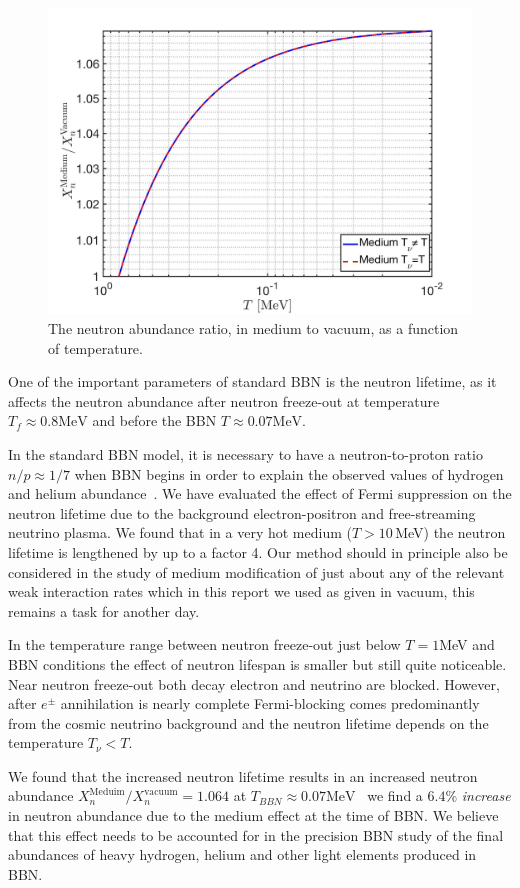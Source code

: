 \begin{figure} 
\centerline{\includegraphics[width=0.8\linewidth]{./plots/Neutron_Abundance}}
\caption{The neutron abundance ratio, in medium to vacuum, as a function of temperature. }
\label{Neutron:Abundance} 
\end{figure}

One of the important parameters of standard BBN is the neutron lifetime, as it affects the neutron abundance after neutron freeze-out at temperature $T_f\approx 0.8 \mathrm{MeV}$ and before the BBN $T\approx0.07 \mathrm{MeV}$. 

In the standard BBN model, it is necessary to have a neutron-to-proton ratio $n/p\approx1/7$ when BBN begins in order to explain the observed values of hydrogen and helium abundance~\cite{Pitrou:2018cgg}. We have evaluated the effect of Fermi suppression on the neutron lifetime due to the background electron-positron  and free-streaming neutrino plasma. We found that in a very hot medium ($T>10$\,MeV) the neutron lifetime is lengthened by up to a factor 4. Our method should in principle also be considered in the study of medium modification of just about any of the relevant weak interaction rates which in this report we used as given in vacuum,  this remains a task for another day.

In the temperature range between neutron freeze-out just below $T=1$\;MeV and BBN conditions the effect of neutron lifespan is smaller but still quite noticeable. Near neutron freeze-out both decay electron and neutrino are blocked. However, after $e^\pm$ annihilation is nearly complete  Fermi-blocking comes predominantly from the cosmic neutrino background and the neutron lifetime depends on the temperature $T_\nu<T$.

We found that the increased neutron lifetime results in an increased neutron abundance ${X_n^{\mathrm{Meduim}}}/{X_n^{\mathrm{vacuum}}}=1.064$ at $T_{BBN}\approx0.07 \mathrm{MeV}$ \ie\ we find a $6.4\%$ \emph{increase} in neutron abundance due to the medium effect at the time of BBN. We believe that this effect needs to be accounted for in the precision BBN study of the final abundances of heavy hydrogen, helium and other light elements produced in BBN.
